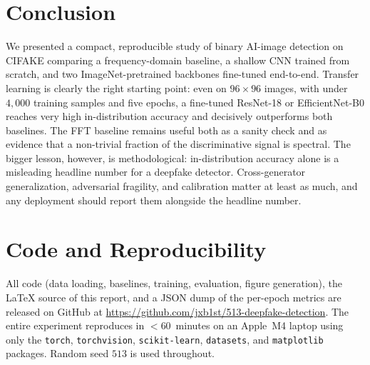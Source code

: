 \documentclass{article}
\begin{document}
\section{Conclusion}
\label{sec:conclusion}

We presented a compact, reproducible study of binary AI-image
detection on \textsc{CIFAKE} comparing a frequency-domain baseline, a
shallow CNN trained from scratch, and two ImageNet-pretrained
backbones fine-tuned end-to-end. Transfer learning is clearly the
right starting point: even on $96{\times}96$ images, with under
$4{,}000$ training samples and five epochs, a fine-tuned
\mbox{ResNet-18} or \mbox{EfficientNet-B0} reaches very high
in-distribution accuracy and decisively outperforms both baselines.
The FFT baseline remains useful both as a sanity check and as
evidence that a non-trivial fraction of the discriminative signal is
spectral. The bigger lesson, however, is methodological: in-distribution
accuracy alone is a misleading headline number for a deepfake
detector. Cross-generator generalization, adversarial fragility, and
calibration matter at least as much, and any deployment should report
them alongside the headline number.

\section*{Code and Reproducibility}

All code (data loading, baselines, training, evaluation, figure
generation), the LaTeX source of this report, and a JSON dump of the
per-epoch metrics are released on GitHub at
\url{https://github.com/jxb1st/513-deepfake-detection}.
The entire experiment reproduces in $<$60~minutes on an
Apple~M4 laptop using only the \texttt{torch}, \texttt{torchvision},
\texttt{scikit-learn}, \texttt{datasets}, and \texttt{matplotlib}
packages. Random seed $513$ is used throughout.
\end{document}
